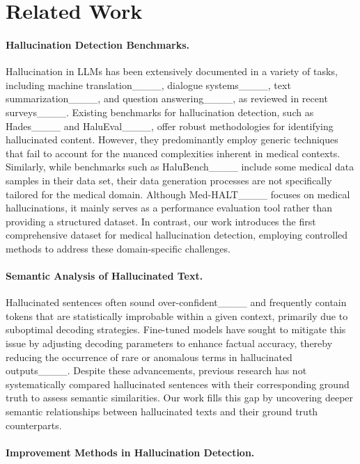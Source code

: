 \section{Related Work}
\vspace{-2mm}
\paragraph{Hallucination Detection Benchmarks.}
 Hallucination in LLMs has been extensively documented in a variety of tasks, including machine translation____, dialogue systems____, text summarization____, and question answering____, as reviewed in recent surveys____. Existing benchmarks for hallucination detection, such as Hades____ and HaluEval____, offer robust methodologies for identifying hallucinated content. However, they predominantly employ generic techniques that fail to account for the nuanced complexities inherent in medical contexts. Similarly, while benchmarks such as HaluBench____ include some medical data samples in their data set, their data generation processes are not specifically tailored for the medical domain. Although Med-HALT____ focuses on medical hallucinations, it mainly serves as a performance evaluation tool rather than providing a structured dataset. In contrast, our work introduces the first comprehensive dataset for medical hallucination detection, employing controlled methods to address these domain-specific challenges.
\vspace{-2mm}
\paragraph{Semantic Analysis of Hallucinated Text.}
Hallucinated sentences often sound over-confident____ and frequently contain tokens that are statistically improbable within a given context, primarily due to suboptimal decoding strategies. Fine-tuned models have sought to mitigate this issue by adjusting decoding parameters to enhance factual accuracy, thereby reducing the occurrence of rare or anomalous terms in hallucinated outputs____. Despite these advancements, previous research has not systematically compared hallucinated sentences with their corresponding ground truth to assess semantic similarities. Our work fills this gap by uncovering deeper semantic relationships between hallucinated texts and their ground truth counterparts.
\vspace{-2mm}

\paragraph{Improvement Methods in Hallucination Detection.}


